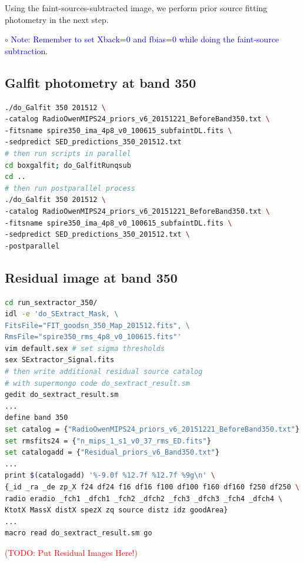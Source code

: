 \documentclass[11pt,a4paper]{article}
\begin{document}
Using the faint-sources-subtracted image, we perform prior source fitting photometry in the next step. 

\indent\hspace{15pt}$\circ$ 
\textcolor{blue}{Note: Remember to set Xback=0 and fbias=0 while doing the faint-source subtraction.}
\\

\subsection{Galfit photometry at band 350}
\label{Band350_Galfit}

\begin{lstlisting}[language=bash]
./do_Galfit 350 201512 \
-catalog RadioOwenMIPS24_priors_v6_20151221_BeforeBand350.txt \
-fitsname spire350_ima_4p8_v0_100615_subfaintDL.fits \
-sedpredict SED_predictions_350_201512.txt
# then run scripts in parallel 
cd boxgalfit; do_GalfitRunqsub
cd ..
# then run postparallel process
./do_Galfit 350 201512 \
-catalog RadioOwenMIPS24_priors_v6_20151221_BeforeBand350.txt \
-fitsname spire350_ima_4p8_v0_100615_subfaintDL.fits \
-sedpredict SED_predictions_350_201512.txt \
-postparallel
\end{lstlisting}

\subsection{Residual image at band 350}
\label{Band350_Galres}

\begin{lstlisting}[language=bash]
cd run_sextractor_350/
idl -e 'do_SExtract_Mask, \
FitsFile="FIT_goodsn_350_Map_201512.fits", \
RmsFile="spire350_rms_4p8_v0_100615.fits"'
vim default.sex # set sigma thresholds
sex SExtractor_Signal.fits
# then write additional residual source catalog
# with supermongo code do_sextract_result.sm
gedit do_sextract_result.sm
...
define band 350
set catalog = {"RadioOwenMIPS24_priors_v6_20151221_BeforeBand350.txt"}
set rmsfits24 = {"n_mips_1_s1_v0_37_rms_ED.fits"}
set catalogadd = {"Residual_priors_v6_Band350.txt"}
...
print $(catalogadd) '%-9.0f %12.7f %12.7f %9g\n' \
{_id _ra _de zp_X f24 df24 f16 df16 f100 df100 f160 df160 f250 df250 \
radio eradio _fch1 _dfch1 _fch2 _dfch2 _fch3 _dfch3 _fch4 _dfch4 \
KtotX MassX distX spezX zq source distz idz goodArea}
...
macro read do_sextract_result.sm go
\end{lstlisting}

\textcolor{red}{(TODO: Put Residual Images Here!)}
\end{document}
